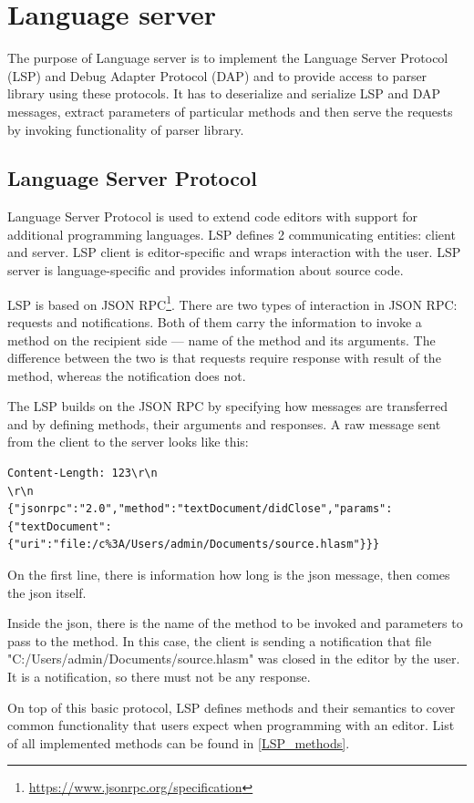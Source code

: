 \chapter{Language server}

The purpose of Language server is to implement the Language Server Protocol (LSP) and Debug Adapter Protocol (DAP) and to provide access to parser library using these protocols. It has to deserialize and serialize LSP and DAP messages, extract parameters of particular methods and then serve the requests by invoking functionality of parser library.

\section{Language Server Protocol}
Language Server Protocol is used to extend code editors with support for additional programming languages. LSP defines 2 communicating entities: client and server. LSP client is editor-specific and wraps interaction with the user. LSP server is language-specific and provides information about source code.

LSP is based on JSON RPC\footnote{\url{https://www.jsonrpc.org/specification}}. There are two types of interaction in JSON RPC: requests and notifications. Both of them carry the information to invoke a method on the recipient side ---  name of the method and its arguments. The difference between the two is that requests require response with result of the method, whereas the notification does not.

The LSP builds on the JSON RPC by specifying how messages are transferred and by defining methods, their arguments and responses. A raw message sent from the client to the server looks like this:
\begin{verbatim}
Content-Length: 123\r\n
\r\n
{"jsonrpc":"2.0","method":"textDocument/didClose","params":{"textDocument":
{"uri":"file:/c%3A/Users/admin/Documents/source.hlasm"}}}
\end{verbatim}
On the first line, there is information how long is the json message, then comes the json itself.

Inside the json, there is the name of the method to be invoked and parameters to pass to the method. In this case, the client is sending a notification that file "C:/Users/admin/Documents/source.hlasm" was closed in the editor by the user. It is a notification, so there must not be any response.

On top of this basic protocol, LSP defines methods and their semantics to cover common functionality that users expect when programming with an editor. List of all implemented methods can be found in \cref{LSP_methods}.

